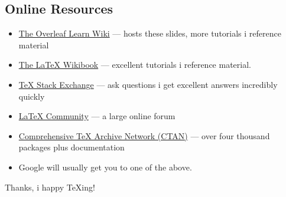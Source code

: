\documentclass{beamer}
\begin{document}
\subsection{Online Resources}
\begin{frame}{\insertsubsection}
\begin{itemize}
\item \href{https://www.overleaf.com/learn}{The Overleaf Learn Wiki} ---
hosts these slides, more tutorials i reference material
\item \href{http://en.wikibooks.org/wiki/LaTeX}{The \LaTeX{} Wikibook} ---
excellent tutorials i reference material.
\item \href{http://tex.stackexchange.com/}{\TeX{} Stack Exchange} --- ask
questions i get excellent answers incredibly quickly
\item \href{http://www.latex-community.org/}{\LaTeX{} Community} --- a large
online forum
\item \href{http://ctan.org/}{Comprehensive \TeX{} Archive Network (CTAN)} ---
over four thousand packages plus documentation
\item Google will usually get you to one of the above.
\end{itemize}
\end{frame}

\begin{frame}
\begin{center}
Thanks, i happy \TeX{}ing!
\end{center}
\end{frame}
\end{document}
